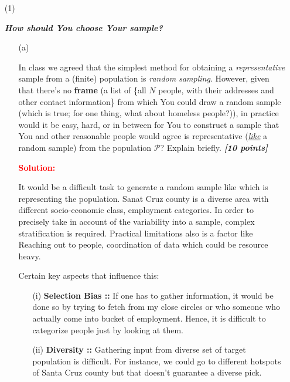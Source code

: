 \documentclass[12pt]{article}
\newcommand{\bi}[1]{\b{\i{#1}}}
\renewcommand{\b}[1]{\textbf{#1}}
\renewcommand{\i}[1]{\textit{#1}}
\renewcommand{\u}[1]{\underline{#1}}
\begin{document}
\begin{itemize}

\item[(1)]

\textbf{\textit{How should You choose Your sample?}}

\begin{itemize}

\item[(a)]

In class we agreed that the simplest method for obtaining a \textit{representative} sample from a (finite) population is \textit{random sampling}. However, given that there's no \b{frame} (a list of \{all $N$ people, with their addresses and other contact information\} from which You could draw a random sample (which is true; for one thing, what about homeless people?)), in practice would it be easy, hard, or in between for You to construct a sample that You and other reasonable people would agree is representative (\i{\u{like}} a random sample) from the population $\mathcal{ P }$? Explain briefly. \bi{[10 points]} \\


\newenvironment{Solution}[1]{%
    \leavevmode\color{#1}\ignorespaces%
}{%
}%


\textbf{\textcolor{red}{Solution:}}
\begin{Solution}{blue}

It would be a difficult task to generate a random sample like which is representing the population. Sanat Cruz county is a diverse area with different socio-economic class, employment categories. In order to precisely take in account of the variability into a sample, complex stratification is required. Practical limitations also is a factor like Reaching out to people, coordination of data which could be resource heavy.

Certain key aspects that influence this:
\begin{itemize}

\item[(i)]
\textbf{Selection Bias ::} If one has to gather information, it would be done so by trying to fetch from my close circles or who someone who actually come into bucket of employment.  Hence, it is difficult to categorize people just by looking at them. 

\item[(ii)]
\textbf{Diversity ::} Gathering input from diverse set of target population is difficult. For instance, we could go to different hotspots of Santa Cruz county but that doesn't guarantee a diverse pick.


\end{itemize}
\end{Solution}
\end{itemize}
\end{itemize}
\end{document}

